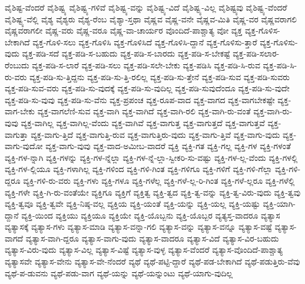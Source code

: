 {ವೈಶಿಷ್ಟ-ವೆಂದರೆ
ವೈಶಿಷ್ಟ್ಯ
ವೈಶಿಷ್ಟ್ಯ-ಗಳಿವೆ
ವೈಶಿಷ್ಟ್ಯ-ವನ್ನು
ವೈಶಿಷ್ಟ್ಯ-ವಿದೆ
ವೈಶಿಷ್ಟ್ಯ-ವಿಲ್ಲ
ವೈಶಿಷ್ಟ್ಯವು
ವೈಶಿಷ್ಟ್ಯ-ವೆಂದರೆ
ವೈಶಿಷ್ಟ್ಯ-ವೆಲ್ಲಿ
ವೈಶ್ಯ
ವೈಶ್ಯರು
ವೈಶ್ಯ-ರೆಂಬ
ವೈಶ್ಯಾ-ಸ್ತಥಾ
ವೈಷ್ಣವ
ವೈಷ್ಣ-ವನೇ
ವೈಷ್ಣವ-ಮಿತಿ
ವೈಷ್ಣ-ವರ
ವೈಷ್ಣವರಾಗಲಿ
ವೈಷ್ಣವರಾಗಲೀ
ವೈಷ್ಣ-ವರು
ವೈಷ್ಣ-ವರೂ
ವೈಷ್ಣ-ವಾ-ಚಾರ್ಯರ
ವೊಂದಿದೆ-ಪಾಶ್ಚಾತ್ಯ
ವೋ
ವ್ಯಕ್ತ
ವ್ಯಕ್ತ-ಗೊಳಿಸ-ಬೇಕಾಗಿದೆ
ವ್ಯಕ್ತ-ಗೊಳಿ-ಸಲು
ವ್ಯಕ್ತ-ಗೊಳಿಸಿ
ವ್ಯಕ್ತ-ಗೊಳಿಸಿದೆ
ವ್ಯಕ್ತ-ಗೊಳಿಸಿ-ದ್ದಾನೆ
ವ್ಯಕ್ತ-ಗೊಳಿಸು-ತ್ತಾರೆ
ವ್ಯಕ್ತ-ಗೊಳಿಸು-ವುದು
ವ್ಯಕ್ತ-ಪಡಿ-ಸದೆ
ವ್ಯಕ್ತ-ಪಡಿ-ಸ-ಬಹುದು
ವ್ಯಕ್ತ-ಪಡಿ-ಸ-ಬಾರದು
ವ್ಯಕ್ತ-ಪಡಿ-ಸ-ಬೇಕಷ್ಟೆ
ವ್ಯಕ್ತ-ಪಡಿ-ಸಲಾರ-ರೆಂಬುದು
ವ್ಯಕ್ತ-ಪಡಿ-ಸ-ಲಾರೆ
ವ್ಯಕ್ತ-ಪಡಿ-ಸಲು
ವ್ಯಕ್ತ-ಪಡಿ-ಸಲೇ-ಬೇಕು
ವ್ಯಕ್ತ-ಪಡಿಸಿ
ವ್ಯಕ್ತ-ಪಡಿ-ಸಿ-ರುವ
ವ್ಯಕ್ತ-ಪಡಿ-ಸಿ-ರು-ವರು
ವ್ಯಕ್ತ-ಪಡಿ-ಸು-ತ್ತಿದ್ದನು
ವ್ಯಕ್ತ-ಪಡಿ-ಸು-ತ್ತಿ-ರಲಿಲ್ಲ
ವ್ಯಕ್ತ-ಪಡಿ-ಸು-ತ್ತೇನೆ
ವ್ಯಕ್ತ-ಪಡಿ-ಸುವ
ವ್ಯಕ್ತ-ಪಡಿ-ಸುವರು
ವ್ಯಕ್ತ-ಪಡಿ-ಸುವ-ವರು
ವ್ಯಕ್ತ-ಪಡಿ-ಸು-ವುದಕ್ಕೆ
ವ್ಯಕ್ತ-ಪಡಿ-ಸು-ವುದಿಲ್ಲ
ವ್ಯಕ್ತ-ಪಡಿ-ಸುವುದೆಂದೂ
ವ್ಯಕ್ತ-ಪಡಿ-ಸು-ವುದೇ
ವ್ಯಕ್ತ-ಪಡಿ-ಸು-ವುವು
ವ್ಯಕ್ತ-ಪಡಿ-ಸು-ವೆನು
ವ್ಯಕ್ತ-ಪ್ರಪಂಚ
ವ್ಯಕ್ತ-ರೂಪ-ವಾದ
ವ್ಯಕ್ತ-ವಾಗದ
ವ್ಯಕ್ತ-ವಾಗಬೇಕಷ್ಟೇ
ವ್ಯಕ್ತ-ವಾಗ-ಬೇಕು
ವ್ಯಕ್ತ-ವಾಗಲೆಣಿ-ಸುವ
ವ್ಯಕ್ತ-ವಾಗಿ
ವ್ಯಕ್ತ-ವಾಗಿದೆ
ವ್ಯಕ್ತ-ವಾಗಿ-ರಲಿ
ವ್ಯಕ್ತ-ವಾಗಿ-ರು-ವಂತೆ
ವ್ಯಕ್ತ-ವಾಗಿ-ರು-ವುವು
ವ್ಯಕ್ತ-ವಾಗಿಲ್ಲ
ವ್ಯಕ್ತ-ವಾಗಿಲ್ಲ-ವೆಂದು
ವ್ಯಕ್ತ-ವಾಗಿವೆ
ವ್ಯಕ್ತ-ವಾಗುತ್ತ
ವ್ಯಕ್ತ-ವಾಗುತ್ತದೆ
ವ್ಯಕ್ತ-ವಾಗುತ್ತವೆ
ವ್ಯಕ್ತ-ವಾಗುತ್ತಾ
ವ್ಯಕ್ತ-ವಾಗು-ತ್ತಿದೆ
ವ್ಯಕ್ತ-ವಾಗುತ್ತಿ-ರುವ
ವ್ಯಕ್ತ-ವಾಗುತ್ತಿರು-ವುದು
ವ್ಯಕ್ತ-ವಾಗು-ತ್ತಿವೆ
ವ್ಯಕ್ತ-ವಾಗು-ವುದು
ವ್ಯಕ್ತ-ವಾಗು-ವುದೋ
ವ್ಯಕ್ತ-ವಾಗು-ವುವು
ವ್ಯಕ್ತ-ವಾದ-ಅಮೀಬ-ವಾದರೆ
ವ್ಯಕ್ತಿ
ವ್ಯಕ್ತಿ-ಗತ
ವ್ಯಕ್ತಿ-ಗಲ್ಲ
ವ್ಯಕ್ತಿ-ಗಳ
ವ್ಯಕ್ತಿ-ಗಳಂತೆ
ವ್ಯಕ್ತಿ-ಗಳ-ನ್ನಾಗಿ
ವ್ಯಕ್ತಿ-ಗಳನ್ನು
ವ್ಯಕ್ತಿ-ಗಳ-ನ್ನೆಲ್ಲಾ
ವ್ಯಕ್ತಿ-ಗಳ-ನ್ನೆ-ಲ್ಲಾ-ಸ್ವೀಕರಿ-ಸು-ವಷ್ಟು
ವ್ಯಕ್ತಿ-ಗಳ-ಲ್ಲ-ವೆಂದು
ವ್ಯಕ್ತಿ-ಗಳಲ್ಲಿ
ವ್ಯಕ್ತಿ-ಗಳ-ಲ್ಲಿಯೂ
ವ್ಯಕ್ತಿ-ಗಳಾಗಿಲ್ಲ
ವ್ಯಕ್ತಿ-ಗಳಿಂದ
ವ್ಯಕ್ತಿ-ಗಳಿ-ಗಿಂತ
ವ್ಯಕ್ತಿ-ಗಳಿಗೂ
ವ್ಯಕ್ತಿ-ಗಳಿಗೆ
ವ್ಯಕ್ತಿ-ಗಳಿ-ಗೆಲ್ಲಾ
ವ್ಯಕ್ತಿ-ಗಳಿ-ದ್ದರೂ
ವ್ಯಕ್ತಿ-ಗಳಿ-ರು-ವರು
ವ್ಯಕ್ತಿ-ಗಳು
ವ್ಯಕ್ತಿ-ಗಳೂ
ವ್ಯಕ್ತಿ-ಗಳೆಲ್ಲ
ವ್ಯಕ್ತಿ-ಗಳೆ-ಲ್ಲ-ರಿ-ಗಿಂತ
ವ್ಯಕ್ತಿ-ಗಳೆ-ಲ್ಲರೂ
ವ್ಯಕ್ತಿ-ಗಳೆಲ್ಲಿ
ವ್ಯಕ್ತಿ-ಗಳೇ
ವ್ಯಕ್ತಿ-ಗಿ-ರು-ವಂತೆಯೇ
ವ್ಯಕ್ತಿಗೂ
ವ್ಯಕ್ತಿಗೆ
ವ್ಯಕ್ತಿತ್ವ
ವ್ಯಕ್ತಿ-ತ್ವದ
ವ್ಯಕ್ತಿ-ತ್ವ-ವನ್ನು
ವ್ಯಕ್ತಿ-ತ್ವ-ವಿರು-ವುದು
ವ್ಯಕ್ತಿ-ತ್ವವು
ವ್ಯಕ್ತಿ-ತ್ವವೂ
ವ್ಯಕ್ತಿ-ತ್ವವೇ
ವ್ಯಕ್ತಿ-ನಿಷ್ಠ-ವಲ್ಲ
ವ್ಯಕ್ತಿಯ
ವ್ಯಕ್ತಿ-ಯಂತೆ
ವ್ಯಕ್ತಿ-ಯನ್ನು
ವ್ಯಕ್ತಿ-ಯಲ್ಲ
ವ್ಯಕ್ತಿ-ಯಷ್ಟು
ವ್ಯಕ್ತಿ-ಯಾಗಿ-ದ್ದಾನೆ
ವ್ಯಕ್ತಿ-ಯಿಂದ
ವ್ಯಕ್ತಿಯು
ವ್ಯಕ್ತಿಯೂ
ವ್ಯಕ್ತಿಯೇ
ವ್ಯಕ್ತಿ-ಯೊಬ್ಬನು
ವ್ಯಕ್ತಿ-ಯೊಬ್ಬರ
ವ್ಯತ್ಯಸ್ತ-ವಾದರೂ
ವ್ಯತ್ಯಾಸ
ವ್ಯತ್ಯಾಸಕ್ಕೆ
ವ್ಯತ್ಯಾಸ-ಗಳು
ವ್ಯತ್ಯಾಸ-ಮಾಡಿ
ವ್ಯತ್ಯಾಸ-ವನ್ನಾ-ಗಲಿ
ವ್ಯತ್ಯಾಸ-ವನ್ನು
ವ್ಯತ್ಯಾಸ-ವನ್ನೂ
ವ್ಯತ್ಯಾಸ-ವಷ್ಟೆ
ವ್ಯತ್ಯಾಸ-ವಾಗದೆ
ವ್ಯತ್ಯಾಸ-ವಾಗಿ-ದ್ದರೂ
ವ್ಯತ್ಯಾಸ-ವಾಗು-ವುದು
ವ್ಯತ್ಯಾಸ-ವಾದರೂ
ವ್ಯತ್ಯಾಸ-ವಿದೆ
ವ್ಯತ್ಯಾಸ-ವಿರ-ಬಹುದು
ವ್ಯತ್ಯಾಸ-ವಿರು-ವುದು
ವ್ಯತ್ಯಾಸ-ವಿಲ್ಲ
ವ್ಯತ್ಯಾಸ-ವಿಷ್ಟೆ
ವ್ಯತ್ಯಾಸ-ವುಳ್ಳ
ವ್ಯತ್ಯಾಸ-ವೆಂದರೆ
ವ್ಯತ್ಯಾಸ-ವೊಂದಿದೆ-ಪಾಶ್ಚಾತ್ಯ
ವ್ಯತ್ಯಾಸವೇ
ವ್ಯತ್ಯಾಸ-ವೇನು
ವ್ಯತ್ಯಾಸ-ವೇ-ನೆಂದರೆ
ವ್ಯಥೆ
ವ್ಯಥೆ-ಪಟ್ಟಿ-ದ್ದಾರೆ
ವ್ಯಥೆ-ಪಡ-ಬೇಕಾಗಿದೆ
ವ್ಯಥೆ-ಪಡುತ್ತಿರು-ವೆವು
ವ್ಯಥೆ-ಪ-ಡುವನು
ವ್ಯಥೆ-ಪಡು-ವಾಗ
ವ್ಯಥೆ-ಯನ್ನು
ವ್ಯಥೆ-ಯನ್ನುಂಟು
ವ್ಯಥೆ-ಯಾಗು-ವುದಿಲ್ಲ
}
